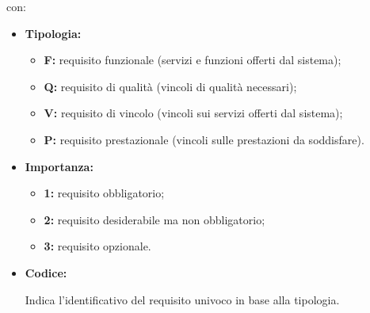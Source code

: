        con: 
        \begin{itemize}
            \item \textbf{Tipologia:}
                \begin{itemize}
                    \item \textbf{F:} requisito funzionale (servizi e funzioni offerti dal sistema);
                    \item \textbf{Q:} requisito di qualità (vincoli di qualità necessari);
                    \item \textbf{V:} requisito di vincolo (vincoli sui servizi offerti dal sistema);
                    \item \textbf{P:} requisito prestazionale (vincoli sulle prestazioni da soddisfare).
                \end{itemize}
                
            \item \textbf{Importanza:}
                \begin{itemize}
                    \item \textbf{1:} requisito obbligatorio;
                    \item \textbf{2:} requisito desiderabile ma non obbligatorio;
                    \item \textbf{3:} requisito opzionale.
                \end{itemize}
            \item \textbf{Codice:} 
                \par Indica l'identificativo del requisito univoco in base alla tipologia.
            
        \end{itemize}
        
